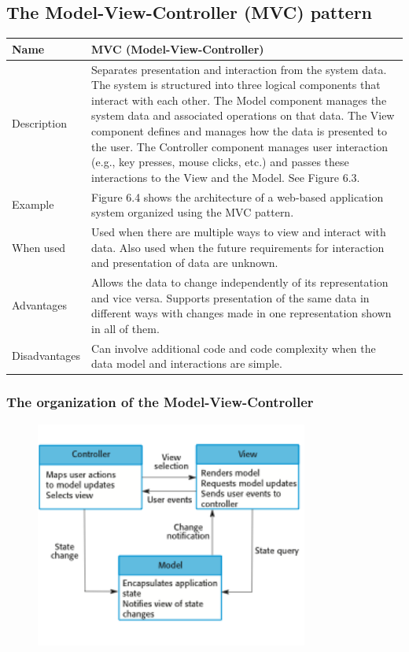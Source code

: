 \subsection{The Model-View-Controller (MVC) pattern}

\begin{table}[h!]
\centering
\begin{tabular}{ |p{3cm}|p{8cm}|  }
\hline
Name & MVC (Model-View-Controller) \\
\hline
\hline
Description & Separates presentation and interaction from the system data. The system is structured into three logical components that interact with each other. The Model component manages the system data and associated operations on that data. The View component defines and manages how the data is presented to the user. The Controller component manages user interaction (e.g., key presses, mouse clicks, etc.) and passes these interactions to the View and the Model. See Figure 6.3.\\
\hline
Example & Figure 6.4 shows the architecture of a web-based application system organized using the MVC pattern.\\
\hline
When used & Used when there are multiple ways to view and interact with data. Also used when the future requirements for interaction and presentation of data are unknown.\\
\hline
Advantages & Allows the data to change independently of its representation and vice versa. Supports presentation of the same data in different ways with changes made in one representation shown in all of them.\\
\hline
Disadvantages & Can involve additional code and code complexity when the data model and interactions are simple.\\
\hline
\end{tabular}

\label{table:T2_3}
\end{table}
\subsubsection{The organization of the Model-View-Controller}
\begin{figure}[h!]
    \centering
    \includegraphics[width = 0.8\textwidth]{./figures/L3_2.png}
    \caption{}
    \label{fig:L3_2}
\end{figure}
\newpage
